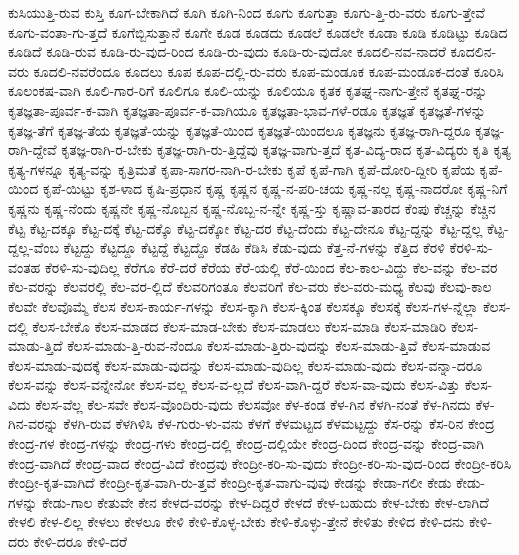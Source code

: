 {ಕುಸಿಯುತ್ತಿ-ರುವ
ಕುಸ್ತಿ
ಕೂಗ-ಬೇಕಾಗಿದೆ
ಕೂಗಿ
ಕೂಗಿ-ನಿಂದ
ಕೂಗು
ಕೂಗುತ್ತಾ
ಕೂಗು-ತ್ತಿ-ರು-ವರು
ಕೂಗು-ತ್ತೇವೆ
ಕೂಗು-ವಂತಾ-ಗು-ತ್ತದೆ
ಕೂಗೆಬ್ಬಿಸುತ್ತಾನೆ
ಕೂಗೇ
ಕೂಡ
ಕೂಡದು
ಕೂಡಲೆ
ಕೂಡಲೇ
ಕೂಡಾ
ಕೂಡಿ
ಕೂಡಿಟ್ಟು
ಕೂಡಿದ
ಕೂಡಿದೆ
ಕೂಡಿ-ರುವ
ಕೂಡಿ-ರು-ವುದ-ರಿಂದ
ಕೂಡಿ-ರು-ವುದು
ಕೂಡಿ-ರು-ವುದೋ
ಕೂದಲಿ-ನವ-ನಾದರೆ
ಕೂದಲಿನ-ವರು
ಕೂದಲಿ-ನವರೆಂದೂ
ಕೂದಲು
ಕೂಪ
ಕೂಪ-ದಲ್ಲಿ-ರು-ವರು
ಕೂಪ-ಮಂಡೂಕ
ಕೂಪ-ಮಂಡೂಕ-ದಂತೆ
ಕೂರಿಸಿ
ಕೂಲಂಕಷ-ವಾಗಿ
ಕೂಲಿ-ಗಾರ-ರಿಗೆ
ಕೂಲಿಗೂ
ಕೂಲಿ-ಯನ್ನು
ಕೂಲಿಯೂ
ಕೃತಕ
ಕೃತಘ್ನ-ನಾಗು-ತ್ತೇನೆ
ಕೃತಘ್ನ-ರನ್ನು
ಕೃತಜ್ಞತಾ-ಪೂರ್ವ-ಕ-ವಾಗಿ
ಕೃತಜ್ಞತಾ-ಪೂರ್ವ-ಕ-ವಾಗಿಯೂ
ಕೃತಜ್ಞತಾ-ಭಾವ-ಗಳೆ-ರಡೂ
ಕೃತಜ್ಞತೆ
ಕೃತಜ್ಞತೆ-ಗಳನ್ನು
ಕೃತಜ್ಞ-ತೆಗೆ
ಕೃತಜ್ಞ-ತೆಯ
ಕೃತಜ್ಞತೆ-ಯನ್ನು
ಕೃತಜ್ಞತೆ-ಯಿಂದ
ಕೃತಜ್ಞತೆ-ಯಿಂದಲೂ
ಕೃತಜ್ಞನು
ಕೃತಜ್ಞ-ರಾಗಿ-ದ್ದರೂ
ಕೃತಜ್ಞ-ರಾಗಿ-ದ್ದೇವೆ
ಕೃತಜ್ಞ-ರಾಗಿ-ರ-ಬೇಕು
ಕೃತಜ್ಞ-ರಾಗಿ-ರು-ತ್ತಿದ್ದೆವು
ಕೃತಜ್ಞ-ವಾಗು-ತ್ತದೆ
ಕೃತ-ವಿದ್ಯ-ರಾದ
ಕೃತ-ವಿದ್ಯರು
ಕೃತಿ
ಕೃತ್ಯ
ಕೃತ್ಯ-ಗಳನ್ನೂ
ಕೃತ್ಯ-ವನ್ನು
ಕೃತ್ರಿಮತೆ
ಕೃಪಾ-ಸಾಗರ-ನಾಗಿ-ರ-ಬೇಕು
ಕೃಪೆ
ಕೃಪೆ-ಗಾಗಿ
ಕೃಪೆ-ದೋರಿ-ದ್ದೀರಿ
ಕೃಪೆಯ
ಕೃಪೆ-ಯಿಂದ
ಕೃಪೆ-ಯಿಟ್ಟು
ಕೃಶ-ಳಾದ
ಕೃಷಿ-ಪ್ರಧಾನ
ಕೃಷ್ಣ
ಕೃಷ್ಣನ
ಕೃಷ್ಣ-ನ-ಪರಿ-ಚಯ
ಕೃಷ್ಣ-ನಲ್ಲ
ಕೃಷ್ಣ-ನಾದರೋ
ಕೃಷ್ಣ-ನಿಗೆ
ಕೃಷ್ಣನು
ಕೃಷ್ಣ-ನೆಂದು
ಕೃಷ್ಣನೇ
ಕೃಷ್ಣ-ನೊಬ್ಬನ
ಕೃಷ್ಣ-ನೊಬ್ಬ-ನ-ನ್ನೇ
ಕೃಷ್ಣ-ಸ್ತು
ಕೃಷ್ಣಾವ-ತಾರದ
ಕೆಂಪು
ಕೆಚ್ಚನ್ನು
ಕೆಚ್ಚಿನ
ಕೆಟ್ಟ
ಕೆಟ್ಟ-ದಕ್ಕೂ
ಕೆಟ್ಟ-ದಕ್ಕೆ
ಕೆಟ್ಟ-ದಕ್ಕೊ
ಕೆಟ್ಟ-ದಕ್ಕೋ
ಕೆಟ್ಟ-ದರ
ಕೆಟ್ಟ-ದೆಂದು
ಕೆಟ್ಟ-ದೇನೂ
ಕೆಟ್ಟ-ದ್ದನ್ನು
ಕೆಟ್ಟ-ದ್ದಲ್ಲ
ಕೆಟ್ಟ-ದ್ದಲ್ಲ-ವೆಂಬ
ಕೆಟ್ಟದ್ದು
ಕೆಟ್ಟದ್ದೂ
ಕೆಟ್ಟದ್ದೆ
ಕೆಟ್ಟದ್ದೊ
ಕೆಡಹಿ
ಕೆಡಿಸಿ
ಕೆಡು-ವುದು
ಕೆತ್ತ-ನೆ-ಗಳನ್ನು
ಕೆತ್ತಿದ
ಕೆರಳಿ
ಕೆರಳಿ-ಸು-ವಂತಹ
ಕೆರಳಿ-ಸು-ವುದಿಲ್ಲ
ಕೆರೆಗೂ
ಕೆರೆ-ದರೆ
ಕೆರೆಯ
ಕೆರೆ-ಯಲ್ಲಿ
ಕೆರೆ-ಯಿಂದ
ಕೆಲ-ಕಾಲ-ವಿದ್ದು
ಕೆಲ-ವನ್ನು
ಕೆಲ-ವರ
ಕೆಲ-ವರನ್ನು
ಕೆಲವರಲ್ಲಿ
ಕೆಲ-ವರ-ಲ್ಲಿದೆ
ಕೆಲವರಿಗಂತೂ
ಕೆಲವರಿಗೆ
ಕೆಲ-ವರು
ಕೆಲ-ವರು-ಮಧ್ಯ
ಕೆಲವು
ಕೆಲವು-ಕಾಲ
ಕೆಲವೇ
ಕೆಲವೊಮ್ಮೆ
ಕೆಲಸ
ಕೆಲಸ-ಕಾರ್ಯ-ಗಳನ್ನು
ಕೆಲಸ-ಕ್ಕಾಗಿ
ಕೆಲಸ-ಕ್ಕಿಂತ
ಕೆಲಸಕ್ಕೂ
ಕೆಲಸಕ್ಕೆ
ಕೆಲಸ-ಗಳ-ನ್ನೆಲ್ಲಾ
ಕೆಲಸ-ದಲ್ಲಿ
ಕೆಲಸ-ಬೇಕೊ
ಕೆಲಸ-ಮಾಡದ
ಕೆಲಸ-ಮಾಡ-ಬೇಕು
ಕೆಲಸ-ಮಾಡಲು
ಕೆಲಸ-ಮಾಡಿ
ಕೆಲಸ-ಮಾಡಿರಿ
ಕೆಲಸ-ಮಾಡು-ತ್ತಿದೆ
ಕೆಲಸ-ಮಾಡು-ತ್ತಿ-ರುವ-ನೆಂದೂ
ಕೆಲಸ-ಮಾಡು-ತ್ತಿರು-ವುದನ್ನು
ಕೆಲಸ-ಮಾಡು-ತ್ತಿವೆ
ಕೆಲಸ-ಮಾಡುವ
ಕೆಲಸ-ಮಾಡು-ವುದಕ್ಕೆ
ಕೆಲಸ-ಮಾಡು-ವುದನ್ನು
ಕೆಲಸ-ಮಾಡು-ವುದಿಲ್ಲ
ಕೆಲಸ-ಮಾಡು-ವುದು
ಕೆಲಸ-ವನ್ನಾ-ದರೂ
ಕೆಲಸ-ವನ್ನು
ಕೆಲಸ-ವನ್ನೇನೋ
ಕೆಲಸ-ವಲ್ಲ
ಕೆಲಸ-ವ-ಲ್ಲದೆ
ಕೆಲಸ-ವಾಗಿ-ದ್ದರೆ
ಕೆಲಸ-ವಾ-ವುದು
ಕೆಲಸ-ವಿತ್ತು
ಕೆಲಸ-ವಿದು
ಕೆಲಸ-ವೆಲ್ಲ
ಕೆಲ-ಸವೇ
ಕೆಲಸ-ವೊಂದಿರು-ವುದು
ಕೆಲಸವೋ
ಕೆಳ-ಕಂಡ
ಕೆಳ-ಗಿನ
ಕೆಳಗಿ-ನಂತೆ
ಕೆಳ-ಗಿನದು
ಕೆಳ-ಗಿನ-ವರನ್ನು
ಕೆಳಗಿ-ರುವ
ಕೆಳಗಿಳಿಸಿ
ಕೆಳ-ಗುರು-ಳು-ವನು
ಕೆಳಗೆ
ಕೆಳಮಟ್ಟದ
ಕೆಳಮಟ್ಟದ್ದು
ಕೆಸ-ರನ್ನು
ಕೆಸ-ರಿನ
ಕೇಂದ್ರ
ಕೇಂದ್ರ-ಗಳ
ಕೇಂದ್ರ-ಗಳನ್ನು
ಕೇಂದ್ರ-ಗಳು
ಕೇಂದ್ರ-ದಲ್ಲಿ
ಕೇಂದ್ರ-ದಲ್ಲಿಯೇ
ಕೇಂದ್ರ-ದಿಂದ
ಕೇಂದ್ರ-ವನ್ನು
ಕೇಂದ್ರ-ವಾಗಿ
ಕೇಂದ್ರ-ವಾಗಿದೆ
ಕೇಂದ್ರ-ವಾದ
ಕೇಂದ್ರ-ವಿದೆ
ಕೇಂದ್ರವು
ಕೇಂದ್ರೀ-ಕರಿ-ಸು-ವುದು
ಕೇಂದ್ರೀ-ಕರಿ-ಸು-ವುದ-ರಿಂದ
ಕೇಂದ್ರೀ-ಕರಿಸಿ
ಕೇಂದ್ರೀ-ಕೃತ-ವಾಗಿದೆ
ಕೇಂದ್ರೀ-ಕೃತ-ವಾಗಿ-ರು-ತ್ತವೆ
ಕೇಂದ್ರೀ-ಕೃತ-ವಾಗು-ವುವು
ಕೇಡನ್ನು
ಕೇಡಾ-ಗಲೀ
ಕೇಡು
ಕೇಡು-ಗಳನ್ನು
ಕೇಡು-ಗಾಲ
ಕೇತುವೇ
ಕೇನ
ಕೇಳದ-ವರನ್ನು
ಕೇಳ-ದಿದ್ದರೆ
ಕೇಳದೆ
ಕೇಳ-ಬಹುದು
ಕೇಳ-ಬೇಕು
ಕೇಳ-ಲಾಗಿದೆ
ಕೇಳಲಿ
ಕೇಳ-ಲಿಲ್ಲ
ಕೇಳಲು
ಕೇಳಲೂ
ಕೇಳಿ
ಕೇಳಿ-ಕೊಳ್ಳ-ಬೇಕು
ಕೇಳಿ-ಕೊಳ್ಳು-ತ್ತೇನೆ
ಕೇಳಿತು
ಕೇಳಿದ
ಕೇಳಿ-ದನು
ಕೇಳಿ-ದರು
ಕೇಳಿ-ದರೂ
ಕೇಳಿ-ದರೆ
}
